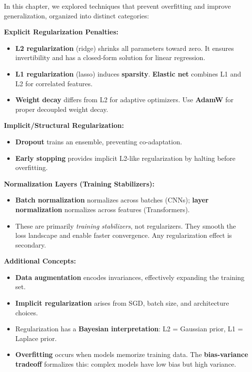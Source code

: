\documentclass[../../main.tex]{subfiles}
\begin{document}
In this chapter, we explored techniques that prevent overfitting and improve generalization, organized into distinct categories:

\textbf{Explicit Regularization Penalties:}
\begin{itemize}
    \item \textbf{L2 regularization} (ridge) shrinks all parameters toward zero. It ensures invertibility and has a closed-form solution for linear regression.
    \item \textbf{L1 regularization} (lasso) induces \textbf{sparsity}. \textbf{Elastic net} combines L1 and L2 for correlated features.
    \item \textbf{Weight decay} differs from L2 for adaptive optimizers. Use \textbf{AdamW} for proper decoupled weight decay.
\end{itemize}

\textbf{Implicit/Structural Regularization:}
\begin{itemize}
    \item \textbf{Dropout} trains an ensemble, preventing co-adaptation.
    \item \textbf{Early stopping} provides implicit L2-like regularization by halting before overfitting.
\end{itemize}

\textbf{Normalization Layers (Training Stabilizers):}
\begin{itemize}
    \item \textbf{Batch normalization} normalizes across batches (CNNs); \textbf{layer normalization} normalizes across features (Transformers).
    \item These are primarily \textit{training stabilizers}, not regularizers. They smooth the loss landscape and enable faster convergence. Any regularization effect is secondary.
\end{itemize}

\textbf{Additional Concepts:}
\begin{itemize}
    \item \textbf{Data augmentation} encodes invariances, effectively expanding the training set.
    \item \textbf{Implicit regularization} arises from SGD, batch size, and architecture choices.
    \item Regularization has a \textbf{Bayesian interpretation}: L2 = Gaussian prior, L1 = Laplace prior.
    \item \textbf{Overfitting} occurs when models memorize training data. The \textbf{bias-variance tradeoff} formalizes this: complex models have low bias but high variance.
\end{itemize}
\end{document}
